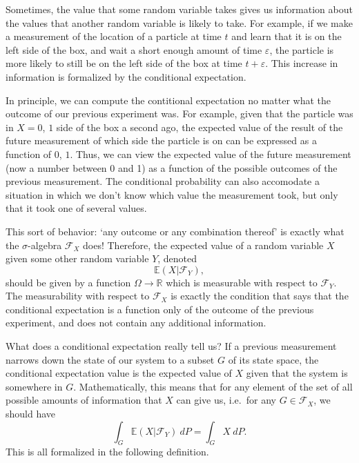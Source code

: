 \documentclass[a4paper,12pt]{scrreprt}
\newcommand{\R}{\mathbb{R}}
\theoremstyle{definition}
\theoremstyle{plain}
\theoremstyle{remark}
\begin{document}
Sometimes, the value that some random variable takes gives us information about the values that another random variable is likely to take. For example, if we make a measurement of the location of a particle at time $t$ and learn that it is on the left side of the box, and wait a short enough amount of time $\varepsilon$, the particle is more likely to still be on the left side of the box at time $t + \varepsilon$. This increase in information is formalized by the conditional expectation.

In principle, we can compute the contitional expectation no matter what the outcome of our previous experiment was. For example, given that the particle was in $X = 0$, $1$ side of the box a second ago, the expected value of the result of the future measurement of which side the particle is on can be expressed as a function of $0$, $1$. Thus, we can view the expected value of the future measurement (now a number between 0 and 1) as a function of the possible outcomes of the previous measurement. The conditional probability can also accomodate a situation in which we don't know which value the measurement took, but only that it took one of several values.

This sort of behavior: `any outcome or any combination thereof' is exactly what the $\sigma$-algebra $\mathcal{F}_{X}$ does! Therefore, the expected value of a random variable $X$ given some other random variable $Y$, denoted
\begin{equation*}
  \mathbb{E}(X | \mathcal{F}_{Y}),
\end{equation*}
should be given by a function $\Omega \to \R$ which is measurable with respect to $\mathcal{F}_{Y}$. The measurability with respect to $\mathcal{F}_{X}$ is exactly the condition that says that the conditional expectation is a function only of the outcome of the previous experiment, and does not contain any additional information.

What does a conditional expectation really tell us? If a previous measurement narrows down the state of our system to a subset $G$ of its state space, the conditional expectation value is the expected value of $X$ given that the system is somewhere in $G$. Mathematically, this means that for any element of the set of all possible amounts of information that $X$ can give us, i.e.\ for any $G \in \mathcal{F}_{X}$, we should have
\begin{equation*}
  \int_{G} \mathbb{E}(X | \mathcal{F}_{Y})\ dP = \int_{G} X\ dP.
\end{equation*}
This is all formalized in the following definition.
\end{document}
